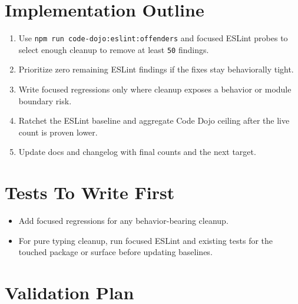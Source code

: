 \section{Implementation Outline}\label{record-241-implementation-outline}

\begin{enumerate}
\def\labelenumi{\arabic{enumi}.}
\tightlist
\item
  Use \texttt{n\allowbreak{}p\allowbreak{}m\allowbreak{} \allowbreak{}r\allowbreak{}u\allowbreak{}n\allowbreak{} \allowbreak{}c\allowbreak{}o\allowbreak{}d\allowbreak{}e\allowbreak{}-\allowbreak{}d\allowbreak{}o\allowbreak{}j\allowbreak{}o\allowbreak{}:\allowbreak{}e\allowbreak{}s\allowbreak{}l\allowbreak{}i\allowbreak{}n\allowbreak{}t\allowbreak{}:\allowbreak{}o\allowbreak{}f\allowbreak{}f\allowbreak{}e\allowbreak{}n\allowbreak{}d\allowbreak{}e\allowbreak{}r\allowbreak{}s} and focused ESLint probes to select enough cleanup to remove at least \texttt{5\allowbreak{}0} findings.
\item
  Prioritize zero remaining ESLint findings if the fixes stay behaviorally tight.
\item
  Write focused regressions only where cleanup exposes a behavior or module boundary risk.
\item
  Ratchet the ESLint baseline and aggregate Code Dojo ceiling after the live count is proven lower.
\item
  Update docs and changelog with final counts and the next target.
\end{enumerate}

\section{Tests To Write First}\label{record-241-tests-to-write-first}

\begin{itemize}
\tightlist
\item
  Add focused regressions for any behavior-bearing cleanup.
\item
  For pure typing cleanup, run focused ESLint and existing tests for the touched package or surface before updating baselines.
\end{itemize}

\section{Validation Plan}\label{record-241-validation-plan}

